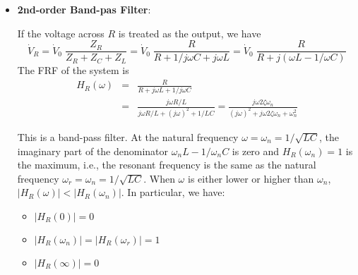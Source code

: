 \begin{itemize}

\item {\bf 2nd-order Band-pas Filter}:

  If the voltage across $R$ is treated as the output, we have
  \[
  \dot{V}_R=\dot{V}_0\;\frac{Z_R}{Z_R+Z_C+Z_L}
  =\dot{V}_0\;\frac{R}{R+1/j\omega C+j\omega L}
  =\dot{V}_0\;\frac{R}{R+j(\omega L-1/\omega C)}
  \]
  The FRF of the system is
  \begin{eqnarray}
  H_R(\omega)&=&\frac{R}{R+j\omega L+1/j\omega C}
  \nonumber\\
  &=&\frac{j\omega R/L}{j\omega R/L+(j\omega)^2+1/LC}
  =\frac{j\omega 2\zeta \omega_n}{(j\omega)^2
    +j\omega 2\zeta \omega_n+\omega_n^2}	
  \nonumber
  \end{eqnarray}

  This is a band-pass filter. At the natural frequency 
  $\omega=\omega_n=1/\sqrt{LC}$, the imaginary part of the denominator
  $\omega_n L-1/\omega_n C$ is zero and $H_R(\omega_n)=1$ is the 
  maximum, i.e., the resonant frequency is the same as the natural 
  frequency $\omega_r=\omega_n=1/\sqrt{LC}$. When $\omega$ is either 
  lower or higher than $\omega_n$, $|H_R(\omega)|<|H_R(\omega_n)|$. In
  particular, we have:

  \begin{itemize}
  \item $|H_R(0)|=0$
  \item $|H_R(\omega_n)|=|H_R(\omega_r)|=1$
  \item $|H_R(\infty)|=0$
  \end{itemize}


\end{itemize}
